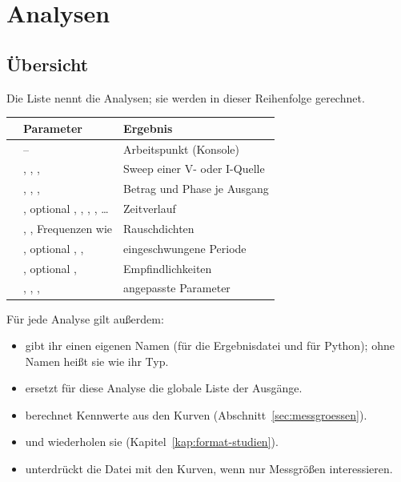 \chapter{Analysen}
\label{kap:format-analysen}

\section{Übersicht}

Die Liste  nennt die Analysen; sie werden in dieser
Reihenfolge gerechnet.

\begin{center}
\begin{tabularx}{\textwidth}{@{}lP{5.6cm}L@{}}
  \toprule
   & Parameter & Ergebnis \\
  \midrule
   & – & Arbeitspunkt (Konsole) \\
   & , , ,  & Sweep einer V- oder I-Quelle \\
   & , , ,  & Betrag und Phase je Ausgang \\
   & , optional , , , , \dots & Zeitverlauf \\
   & , , Frequenzen wie  & Rauschdichten \\
   & , optional , ,  & eingeschwungene Periode \\
   & , optional ,  & Empfindlichkeiten \\
   & , , ,  & angepasste Parameter \\
  \bottomrule
\end{tabularx}
\end{center}

Für jede Analyse gilt außerdem:

\begin{itemize}
  \item {} gibt ihr einen eigenen Namen (für die Ergebnisdatei
    und für Python); ohne Namen heißt sie wie ihr Typ.
  \item {} ersetzt für diese Analyse die globale Liste der
    Ausgänge.
  \item {} berechnet Kennwerte aus den Kurven
    (Abschnitt~\ref{sec:messgroessen}).
  \item {} und  wiederholen sie
    (Kapitel~\ref{kap:format-studien}).
  \item {} unterdrückt die Datei mit den Kurven, wenn nur
    Messgrößen interessieren.
\end{itemize}

